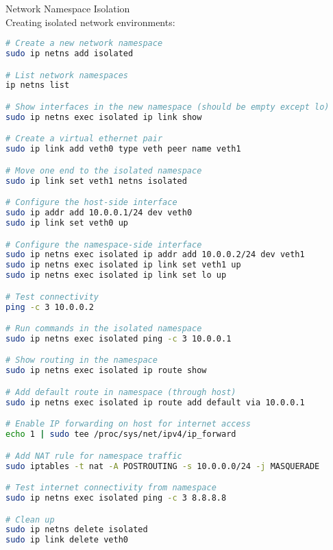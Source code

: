 \begin{example2}{Network Namespace Isolation}\\
    Creating isolated network environments:
    
\begin{lstlisting}[language=bash, style=basesmol]
# Create a new network namespace
sudo ip netns add isolated

# List network namespaces
ip netns list

# Show interfaces in the new namespace (should be empty except lo)
sudo ip netns exec isolated ip link show

# Create a virtual ethernet pair
sudo ip link add veth0 type veth peer name veth1

# Move one end to the isolated namespace
sudo ip link set veth1 netns isolated

# Configure the host-side interface
sudo ip addr add 10.0.0.1/24 dev veth0
sudo ip link set veth0 up

# Configure the namespace-side interface
sudo ip netns exec isolated ip addr add 10.0.0.2/24 dev veth1
sudo ip netns exec isolated ip link set veth1 up
sudo ip netns exec isolated ip link set lo up

# Test connectivity
ping -c 3 10.0.0.2

# Run commands in the isolated namespace
sudo ip netns exec isolated ping -c 3 10.0.0.1

# Show routing in the namespace
sudo ip netns exec isolated ip route show

# Add default route in namespace (through host)
sudo ip netns exec isolated ip route add default via 10.0.0.1

# Enable IP forwarding on host for internet access
echo 1 | sudo tee /proc/sys/net/ipv4/ip_forward

# Add NAT rule for namespace traffic
sudo iptables -t nat -A POSTROUTING -s 10.0.0.0/24 -j MASQUERADE

# Test internet connectivity from namespace
sudo ip netns exec isolated ping -c 3 8.8.8.8

# Clean up
sudo ip netns delete isolated
sudo ip link delete veth0
\end{lstlisting}
\end{example2}



